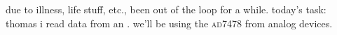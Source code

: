 due to illness, life stuff, etc., been out of the loop for a while. today's
task: thomas \amp i read data from an \adc. we'll be using the \textsc{ad7478}
from analog devices.
